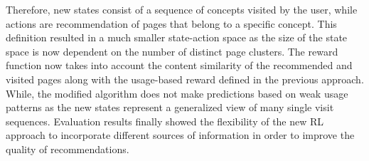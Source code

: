 Therefore, new states consist of a sequence of concepts visited by the user, while actions are recommendation of pages that belong to a specific concept. This definition resulted in a much smaller state-action space as the size of the state space is now dependent on the number of distinct page clusters. The reward function now takes into account the content similarity of the recommended and visited pages along with the usage-based reward defined in the previous approach. While, the modified algorithm does not make predictions based on weak usage patterns as the new states represent a generalized view of many single visit sequences. Evaluation results finally showed the flexibility of the new RL approach to incorporate different sources of information in order to improve the quality of recommendations.
%
%
%
